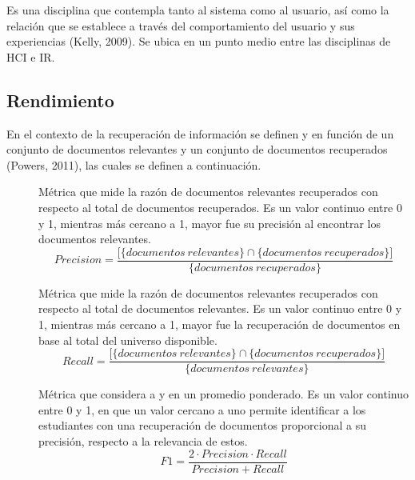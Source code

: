 Es una disciplina que contempla tanto al sistema como al usuario, así como la relación que se establece a través del comportamiento del usuario y sus experiencias (Kelly, 2009). Se ubica en un punto medio entre las disciplinas de HCI e IR.

\subsection{Rendimiento}
\label{subsec:rendimiento}
En el contexto de la recuperación de información se definen  y  en función de un conjunto de documentos relevantes y un conjunto de documentos recuperados (Powers, 2011), las cuales se definen a continuación.  

\begin{description}
	\item [] Métrica que mide la razón de documentos relevantes recuperados con 
respecto al total de documentos recuperados. Es un valor continuo entre 0 y 1, mientras más cercano a 1, mayor fue su precisión al encontrar los documentos relevantes.
	\begin{equation}
	Precision = \frac{\big[\big\{documentos \ relevantes\big\} \cap \big\{documentos \ recuperados\big\}\big]}{\big\{documentos \ recuperados\big\}}
	\end{equation}

	\item [] Métrica que mide la razón de documentos relevantes recuperados con 
respecto al total de documentos relevantes. Es un valor continuo entre 0 y 1, mientras más cercano a 1, mayor fue la recuperación de documentos en base al total del universo disponible.
	\begin{equation}
	Recall = \frac{\big[\big\{documentos \ relevantes\big\} \cap \big\{documentos \ recuperados\big\}\big]}{\big\{documentos \ relevantes\big\}}
	\end{equation}

	\item [] Métrica que considera a  y  en un promedio ponderado. Es un valor continuo entre 0 y 1, en que un valor cercano a uno permite identificar a los estudiantes con una recuperación de documentos proporcional a su precisión, respecto a la relevancia de estos.   
	\begin{equation}
	F1 = \frac{2 \cdot Precision\cdot Recall}{Precision+ Recall}
	\end{equation}
 

\end{description}

